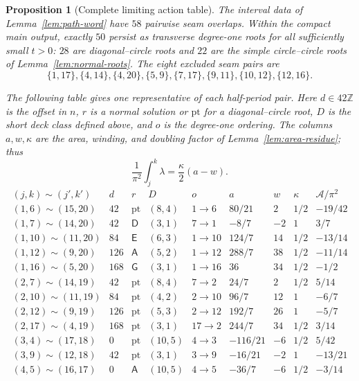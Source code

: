 \documentclass[11pt,reqno]{amsart}
\theoremstyle{plain}
\newtheorem{proposition}[theorem]{Proposition}
\theoremstyle{definition}
\newcommand{\Z}{\mathbb{Z}}
\begin{document}
\begin{proposition}[Complete limiting action table]\label{prop:action-table}
The interval data of Lemma~\ref{lem:path-word} have $58$ pairwise seam overlaps.  Within the
compact main output, exactly $50$ persist as transverse degree-one roots for all sufficiently
small $t>0$: $28$ are diagonal--circle roots and $22$ are the simple circle--circle roots of
Lemma~\ref{lem:normal-roots}.  The eight excluded seam pairs are
\[
 \{1,17\},\{4,14\},\{4,20\},\{5,9\},
 \{7,17\},\{9,11\},\{10,12\},\{12,16\}.
\]

The following table gives one representative of each half-period pair.  Here $d\in42\Z$ is the
offset in $n$, $r$ is a normal solution or $\mathrm{pt}$ for a diagonal--circle root, $D$ is the
short deck class defined above, and $o$ is the degree-one ordering.  The columns $a,w,\kappa$ are
the area, winding, and doubling factor of Lemma~\ref{lem:area-residue}; thus
\begin{equation}\label{eq:area-residue}
 \frac1{\pi^2}\int_j^k\lambda=\frac\kappa2(a-w).
\end{equation}
\begingroup
\scriptsize
\setlength{\tabcolsep}{3.2pt}
\[
\begin{array}{c|r|c|c|c|r|r|c|r}
(j,k)\sim(j',k')&d&r&D&o&a&w&\kappa&\mathcal A/\pi^2\\ \hline
(1,6)\sim(15,20)&42&\mathrm{pt}&(8,4)&1\to6&80/21&2&1/2&-19/42\\
(1,7)\sim(14,20)&42&\mathsf D&(3,1)&7\to1&-8/7&-2&1&3/7\\
(1,10)\sim(11,20)&84&\mathsf E&(6,3)&1\to10&124/7&14&1/2&-13/14\\
(1,12)\sim(9,20)&126&\mathsf A&(5,2)&1\to12&288/7&38&1/2&-11/14\\
(1,16)\sim(5,20)&168&\mathsf G&(3,1)&1\to16&36&34&1/2&-1/2\\
(2,7)\sim(14,19)&42&\mathrm{pt}&(8,4)&7\to2&24/7&2&1/2&5/14\\
(2,10)\sim(11,19)&84&\mathrm{pt}&(4,2)&2\to10&96/7&12&1&-6/7\\
(2,12)\sim(9,19)&126&\mathrm{pt}&(5,3)&2\to12&192/7&26&1&-5/7\\
(2,17)\sim(4,19)&168&\mathrm{pt}&(3,1)&17\to2&244/7&34&1/2&3/14\\
(3,4)\sim(17,18)&0&\mathrm{pt}&(10,5)&4\to3&-116/21&-6&1/2&5/42\\
(3,9)\sim(12,18)&42&\mathrm{pt}&(3,1)&3\to9&-16/21&-2&1&-13/21\\
(4,5)\sim(16,17)&0&\mathsf A&(10,5)&4\to5&-36/7&-6&1/2&-3/14\\

\end{array}\]
\end{proposition}
\end{document}
